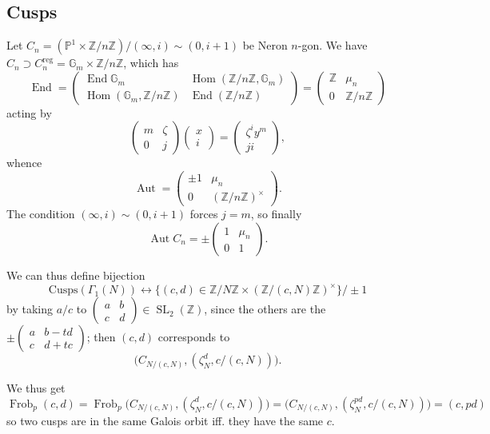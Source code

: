 \documentclass[12pt]{article}
\newcommand{\Z}{\mathbb{Z}}
\renewcommand{\P}{\mathbb{P}}
\newcommand{\G}{\mathbb{G}}
\newcommand{\SL}{\operatorname{SL}}
\newcommand{\Aut}{\operatorname{Aut}}
\newcommand{\Hom}{\operatorname{Hom}}
\newcommand{\End}{\operatorname{End}}
\newcommand{\Frob}{\operatorname{Frob}}
\newcommand{\matabcd}{\left( \begin{smallmatrix} a & b \\ c & d \end{smallmatrix} \right)}
\theoremstyle{definition}
\begin{document}
\subsection{Cusps}

Let $C_n = (\P^1 \times \Z/n\Z) / (\infty,i) \sim (0, i+1)$ be Neron $n$-gon. We have $C_n \supset C_n^{\text{reg}} = \G_m \times \Z/n\Z$, which has
\[ \End = \left( \begin{matrix} \End \G_m & \Hom(\Z/n\Z,\G_m) \\ \Hom(\G_m, \Z/n\Z) & \End(\Z/n\Z) \end{matrix} \right) =  \left( \begin{matrix} \Z & \mu_n \\ 0 & \Z/n\Z \end{matrix} \right) \]
acting by 
\[ \left( \begin{matrix} m & \zeta \\ 0 & j \end{matrix} \right) \left( \begin{matrix} x \\ i \end{matrix} \right)= \left( \begin{matrix} \zeta^i y^m \\ ji \end{matrix} \right),  \]
whence
\[ \Aut =  \left( \begin{matrix} \pm1 & \mu_n \\ 0 &( \Z/n\Z )^\times \end{matrix} \right). \]
The condition $(\infty,i) \sim (0, i+1)$ forces $j=m$, so finally
\[ \Aut C_n = \pm \left( \begin{matrix} 1 & \mu_n \\ 0 &1 \end{matrix} \right). \]

We can thus define bijection
\[ \text{Cusps}(\Gamma_1(N)) \longleftrightarrow \{ (c,d) \in \Z/N\Z \times (\Z/(c,N)\Z)^\times \} / \pm 1 \]
by taking $a/c$ to $\matabcd \in \SL_2(\Z)$, since the others are the $\pm \left( \begin{smallmatrix} a & b-td \\ c & d+tc \end{smallmatrix} \right)$; then $(c,d)$ corresponds to
\[ \big( C_{N/(c,N)}, (\zeta_N^d, c/(c,N) ) \big). \]

We thus get
\[ \Frob_p (c,d) = \Frob_p \big( C_{N/(c,N)}, (\zeta_N^d, c/(c,N) ) \big) = \big( C_{N/(c,N)}, (\zeta_N^{pd}, c/(c,N) ) \big) = (c,pd) \]
so two cusps are in the same Galois orbit iff. they have the same $c$.
\end{document}
